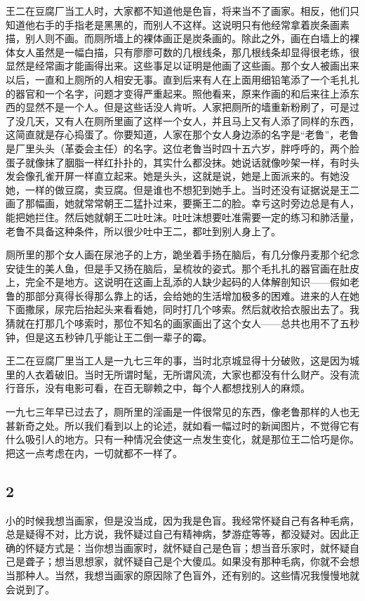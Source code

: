 王二在豆腐厂当工人时，大家都不知道他是色盲，将来当不了画家。相反，他们只知道他右手的手指老是黑黑的，而别人不这样。这说明只有他经常拿着炭条画素描，别人则不画。而厕所墙上的裸体画正是炭条画的。除此之外，画在白墙上的裸体女人虽然是一幅白描，只有廖廖可数的几根线条，那几根线条却显得很老练，很显然是经常画才能画得出来。这些事足以证明是他画了这些画。那个女人被画出来以后，一直和上厕所的人相安无事。直到后来有人在上面用细铅笔添了一个毛扎扎的器官和一个名字，问题才变得严重起来。照他看来，原来作画的和后来往上添东西的显然不是一个人。但是这些话没人肯听。人家把厕所的墙重新粉刷了，可是过了没几天，又有人在厕所里画了这样一个女人，并且马上又有人添了同样的东西，这简直就是存心捣蛋了。你要知道，人家在那个女人身边添的名字是“老鲁”，老鲁是厂里头头（革委会主任）的名字。这位老鲁当时四十五六岁，胖呼呼的，两个脸蛋子就像抹了胭脂一样红扑扑的，其实什么都没抹。她说话就像吵架一样，有时头发会像孔雀开屏一样直立起来。她是头头，这就是说，她是上面派来的。有她没她，一样的做豆腐，卖豆腐。但是谁也不想犯到她手上。当时还没有证据说是王二画了那幅画，她就常常朝王二猛扑过来，要撕王二的脸。幸亏这时旁边总是有人，能把她拦住。然后她就朝王二吐吐沫。吐吐沫想要吐准需要一定的练习和肺活量，老鲁不具备这种条件，所以很少吐中王二，都吐到别人身上了。 

厕所里的那个女人画在尿池子的上方，跪坐着手扬在脑后，有几分像丹麦那个纪念安徒生的美人鱼，但是手又扬在脑后，呈梳妆的姿式。那个毛扎扎的器官画在肚皮上，完全不是地方。这说明在这画上乱添的人缺少起码的人体解剖知识——假如老鲁的那部分真得长得那么靠上的话，会给她的生活增加极多的困难。进来的人在她下面撒尿，尿完后抬起头来看看她，同时打几个哆索。然后就收拾衣服出去了。我猜就在打那几个哆索时，那位不知名的画家画出了这个女人——总共也用不了五秒钟，但是这五秒钟几乎能让王二倒一辈子的霉。 

王二在豆腐厂里当工人是一九七三年的事，当时北京城显得十分破败，这是因为城里的人衣着破旧。当时无所谓时髦，无所谓风流，大家也都没有什么财产。没有流行音乐，没有电影可看，在百无聊赖之中，每个人都想找别人的麻烦。 

一九七三年早已过去了，厕所里的淫画是一件很常见的东西，像老鲁那样的人也无甚新奇之处。所以我们看到以上的论述，就如看一幅过时的新闻图片，不觉得它有什么吸引人的地方。只有一种情况会使这一点发生变化，就是那位王二恰巧是你。把这一点考虑在内，一切就都不一样了。 

\subsection{2} 

小的时候我想当画家，但是没当成，因为我是色盲。我经常怀疑自己有各种毛病，总是疑得不对，比方说，我怀疑过自己有精神病，梦游症等等，都没疑对。因此正确的怀疑方式是：当你想当画家时，就怀疑自己是色盲；想当音乐家时，就怀疑自己是聋子；想当思想家，就怀疑自己是个大傻瓜。如果没有那种毛病，你就不会想当那种人。当然，我想当画家的原因除了色盲外，还有别的。这些情况我慢慢地就会说到了。 

